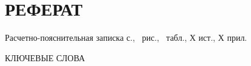 \section*{РЕФЕРАТ}

Расчетно-пояснительная записка \pageref{LastPage} с., \totalfigures\ рис., \totaltables\ табл., Х ист., Х прил.

КЛЮЧЕВЫЕ СЛОВА

\pagebreak
